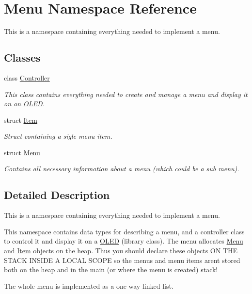 \hypertarget{namespace_menu}{}\section{Menu Namespace Reference}
\label{namespace_menu}


This is a namespace containing everything needed to implement a menu.  


\subsection*{Classes}
\begin{DoxyCompactItemize}
\item 
class \hyperlink{class_menu_1_1_controller}{Controller}
\begin{DoxyCompactList}\small\item\em This class contains everything needed to create and manage a menu and display it on an \hyperlink{class_o_l_e_d}{O\+L\+ED}. \end{DoxyCompactList}\item 
struct \hyperlink{struct_menu_1_1_item}{Item}
\begin{DoxyCompactList}\small\item\em Struct containing a sigle menu item. \end{DoxyCompactList}\item 
struct \hyperlink{struct_menu_1_1_menu}{Menu}
\begin{DoxyCompactList}\small\item\em Contains all necessary information about a menu (which could be a sub menu). \end{DoxyCompactList}\end{DoxyCompactItemize}


\subsection{Detailed Description}
This is a namespace containing everything needed to implement a menu. 

This namespace contains data types for describing a menu, and a controller class to control it and display it on a \hyperlink{class_o_l_e_d}{O\+L\+ED} (library class). The menu allocates \hyperlink{namespace_menu}{Menu} and \hyperlink{struct_menu_1_1_item}{Item} objects on the heap. Thus you should declare these objects ON T\+HE S\+T\+A\+CK I\+N\+S\+I\+DE A L\+O\+C\+AL S\+C\+O\+PE so the menus and menu items aren\textquotesingle{}t stored both on the heap and in the main (or where the menu is created) stack!

The whole menu is implemented as a one way linked list. 